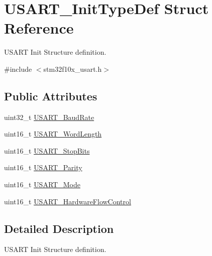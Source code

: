 \hypertarget{structUSART__InitTypeDef}{
\section{USART\_\-InitTypeDef Struct Reference}
\label{structUSART__InitTypeDef}
}


USART Init Structure definition.  




{\ttfamily \#include $<$stm32f10x\_\-usart.h$>$}

\subsection*{Public Attributes}
\begin{DoxyCompactItemize}
\item 
uint32\_\-t \hyperlink{structUSART__InitTypeDef_a6f763cb0e6044f838ee764ce437997b2}{USART\_\-BaudRate}
\item 
uint16\_\-t \hyperlink{structUSART__InitTypeDef_a16d1fb7ccc2b51964f1bcfcbfba6d89d}{USART\_\-WordLength}
\item 
uint16\_\-t \hyperlink{structUSART__InitTypeDef_ac745bceb79a6c4c2640fd8e8ce6639d6}{USART\_\-StopBits}
\item 
uint16\_\-t \hyperlink{structUSART__InitTypeDef_a5ae66aba755bac37c5cf0dfbf529e2ed}{USART\_\-Parity}
\item 
uint16\_\-t \hyperlink{structUSART__InitTypeDef_a7d944d35d7d1fc79a63f249615148584}{USART\_\-Mode}
\item 
uint16\_\-t \hyperlink{structUSART__InitTypeDef_a9996edf3bfd90c36f03b4075969703f5}{USART\_\-HardwareFlowControl}
\end{DoxyCompactItemize}


\subsection{Detailed Description}
USART Init Structure definition. 

